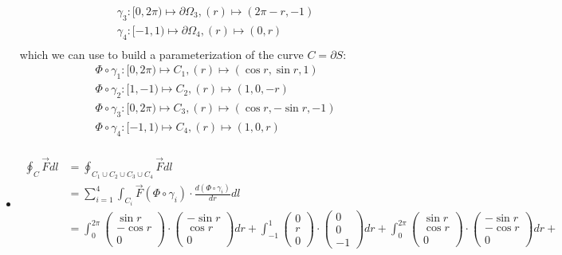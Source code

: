 \documentclass[11pt]{article}
\begin{document}
\begin{solution}
\begin{itemize}
\begin{align*}
	&\gamma_3: [0,2\pi) \mapsto \partial \Omega_3, (r) \mapsto (2\pi - r, -1)\\
	&\gamma_4: [-1,1) \mapsto \partial \Omega_4, (r) \mapsto (0, r)\\
	\end{align*}
	which we can use to build a parameterization of the curve $C = \partial S$:
	\begin{align*}
	&\Phi \circ \gamma_1: [0,2\pi) \mapsto C_1, (r) \mapsto (\cos r, \sin r, 1)\\
	&\Phi \circ \gamma_2: [1,-1)  \mapsto C_2, (r) \mapsto (1, 0, -r)\\
	&\Phi \circ \gamma_3: [0,2\pi) \mapsto C_3, (r) \mapsto (\cos r, -\sin r, -1)\\
	&\Phi \circ \gamma_4: [-1,1) \mapsto C_4, (r) \mapsto (1, 0, r)\\
	\end{align*}
    \item 
	\begin{align*}
	\oint_C \vec F dl &= \oint_{C_1 \cup C_2 \cup C_3\cup C_4} \vec F dl\\
	&= \sum_{i = 1}^4\int_{C_i} \vec F(\Phi\circ \gamma_i) \cdot \frac{d(\Phi\circ \gamma_i)}{dr}dl \\
	&= \int_0^{2\pi} \begin{pmatrix}\sin r\\-\cos r\\0\end{pmatrix}\cdot\begin{pmatrix}-\sin r\\\cos r\\ 0\end{pmatrix}dr + \int_{-1}^{1} \begin{pmatrix}0\\r\\0\end{pmatrix}\cdot\begin{pmatrix}0\\0\\-1\end{pmatrix}dr + \int_0^{2\pi} \begin{pmatrix}\sin r\\ \cos r\\0\end{pmatrix}\cdot\begin{pmatrix}-\sin r\\-\cos r\\ 0\end{pmatrix}dr +\\

\end{align*}
\end{itemize}
\end{solution}
\end{document}

